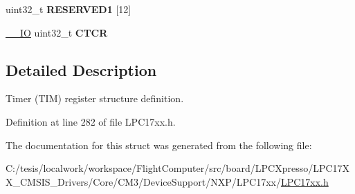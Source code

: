 \begin{DoxyCompactItemize}
\item 
\hypertarget{struct_l_p_c___t_i_m___type_def_a52cad77d7054e9043968f92dc7715662}{uint32\-\_\-t {\bfseries \-R\-E\-S\-E\-R\-V\-E\-D1} \mbox{[}12\mbox{]}}\label{struct_l_p_c___t_i_m___type_def_a52cad77d7054e9043968f92dc7715662}

\item 
\hypertarget{struct_l_p_c___t_i_m___type_def_a28ac125deeebbe8c288a35586e5fa455}{\hyperlink{group___c_m_s_i_s__core__definitions_gaec43007d9998a0a0e01faede4133d6be}{\-\_\-\-\_\-\-I\-O} uint32\-\_\-t {\bfseries \-C\-T\-C\-R}}\label{struct_l_p_c___t_i_m___type_def_a28ac125deeebbe8c288a35586e5fa455}

\end{DoxyCompactItemize}


\subsection{\-Detailed \-Description}
\-Timer (\-T\-I\-M) register structure definition. 

\-Definition at line 282 of file \-L\-P\-C17xx.\-h.



\-The documentation for this struct was generated from the following file\-:\begin{DoxyCompactItemize}
\item 
\-C\-:/tesis/localwork/workspace/\-Flight\-Computer/src/board/\-L\-P\-C\-Xpresso/\-L\-P\-C17\-X\-X\-\_\-\-C\-M\-S\-I\-S\-\_\-\-Drivers/\-Core/\-C\-M3/\-Device\-Support/\-N\-X\-P/\-L\-P\-C17xx/\hyperlink{_l_p_c17xx_8h}{\-L\-P\-C17xx.\-h}\end{DoxyCompactItemize}
